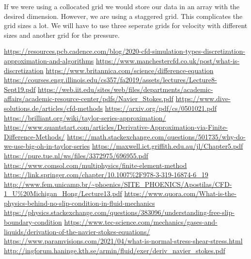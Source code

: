 \documentclass{article}
\begin{document}
If we were using a collocated grid we would store our data in an array with the desired dimension. However, we are using a staggered grid. This complicates the grid sizes a lot. We will have to use three seperate grids for velocity with different sizes and another grid for the pressure.
\newpage
\begin{thebibliography}{3}
\url{https://resources.pcb.cadence.com/blog/2020-cfd-simulation-types-discretization-approximation-and-algorithms}
\url{https://www.manchestercfd.co.uk/post/what-is-discretization}
\url{https://www.britannica.com/science/difference-equation}
\url{https://courses.engr.illinois.edu/cs357/fa2019/assets/lectures/Lecture8-Sept19.pdf}
\url{https://web.iit.edu/sites/web/files/departments/academic-affairs/academic-resource-center/pdfs/Navier_Stokes.pdf}
\url{https://www.dive-solutions.de/articles/cfd-methods}
\url{https://arxiv.org/pdf/cs/0501021.pdf}
\url{https://brilliant.org/wiki/taylor-series-approximation/}
\url{https://www.quantstart.com/articles/Derivative-Approximation-via-Finite-Difference-Methods/}
\url{https://math.stackexchange.com/questions/501735/why-do-we-use-big-oh-in-taylor-series}
\url{https://maxwell.ict.griffith.edu.au/jl/Chapter5.pdf}
\url{https://pure.tue.nl/ws/files/3372975/696955.pdf}
\url{https://www.comsol.com/multiphysics/finite-element-method}
\url{https://link.springer.com/chapter/10.1007\%2F978-3-319-16874-6\_19}
\url{http://www.fem.unicamp.br/~phoenics/SITE_PHOENICS/Apostilas/CFD-1_U\%20Michigan_Hong/Lecture13.pdf}
\url{https://www.quora.com/What-is-the-physics-behind-no-slip-condition-in-fluid-mechanics}
\url{https://physics.stackexchange.com/questions/383096/understanding-free-slip-boundary-condition}
\url{https://www.tec-science.com/mechanics/gases-and-liquids/derivation-of-the-navier-stokes-equations/}
\url{https://www.paramvisions.com/2021/04/what-is-normal-stress-shear-stress.html}
\url{http://ingforum.haninge.kth.se/armin/fluid/exer/deriv_navier_stokes.pdf}

\end{thebibliography}
\end{document}
